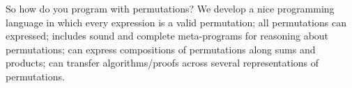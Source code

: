 \documentclass{article}
\begin{document}
So how do you program with permutations? We develop a nice programming language in which every expression is a valid permutation; all permutations can expressed; includes sound and complete meta-programs for reasoning about permutations; can express compositions of permutations along sums and products; can transfer algorithms/proofs across several representations of permutations.

\end{document}
